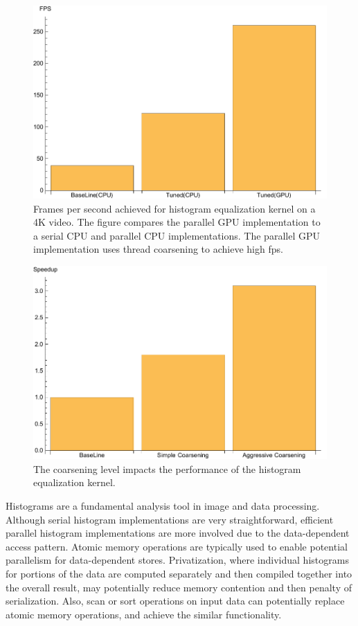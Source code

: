 \begin{figure}
\centering
\includegraphics[scale=0.5]{data/histogram.pdf}
\caption{Frames per second achieved for histogram equalization kernel on a 4K
video. The figure compares the parallel GPU implementation to a serial CPU and
parallel CPU implementations. The parallel GPU implementation uses thread
coarsening to achieve high fps.}
\label{fig:histogram}
\centering
\end{figure}


\begin{figure}
\centering
\includegraphics[scale=0.5]{data/histogramc.pdf}
\caption{The coarsening level impacts the performance of the histogram equalization kernel.}
\label{fig:histogramCoarsining}
\centering
\end{figure}

Histograms are a fundamental analysis tool in image and data processing.
Although serial  histogram implementations are very straightforward, efficient parallel histogram implementations are
more involved due to the data-dependent access pattern. 
Atomic memory operations are typically used to enable potential parallelism for data-dependent stores. 
Privatization, where individual histograms for portions of the data are computed separately
and then compiled together into the overall result, may potentially reduce memory contention and then penalty of serialization.
Also, scan or sort operations on input data can potentially replace atomic memory operations, and achieve the similar functionality.

